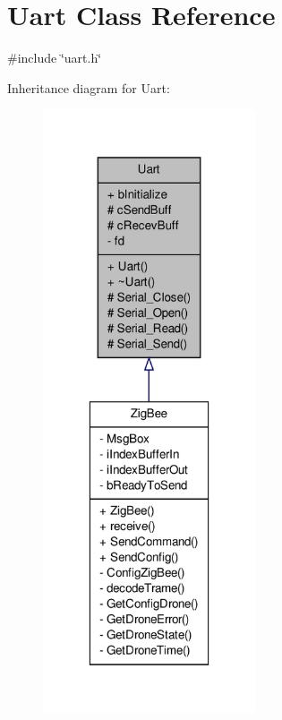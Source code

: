 \hypertarget{classUart}{\section{Uart Class Reference}
\label{classUart}
}


{\ttfamily \#include \char`\"{}uart.\-h\char`\"{}}



Inheritance diagram for Uart\-:\nopagebreak
\begin{figure}[H]
\begin{center}
\leavevmode
\includegraphics[width=178pt]{classUart__inherit__graph}
\end{center}
\end{figure}


